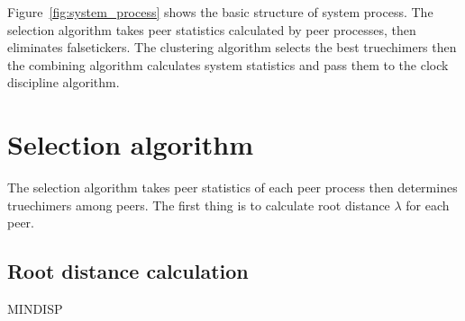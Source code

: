 Figure~\ref{fig:system_process} shows the basic structure of system process.
The selection algorithm takes peer statistics calculated by peer processes,
then eliminates falsetickers. The clustering algorithm selects the best
truechimers then the combining algorithm calculates system statistics and pass
them to the clock discipline algorithm.




\section{Selection algorithm}%
\label{sec:selection_algorithm}
The selection algorithm takes peer statistics of each peer process then
determines truechimers among peers. The first thing is to calculate root
distance $\lambda$ for each peer.

\subsection{Root distance calculation}%
\label{sub:root_distance_calculation}

\begin{myverbbox}
    {\mindisp}MINDISP
\end{myverbbox}

